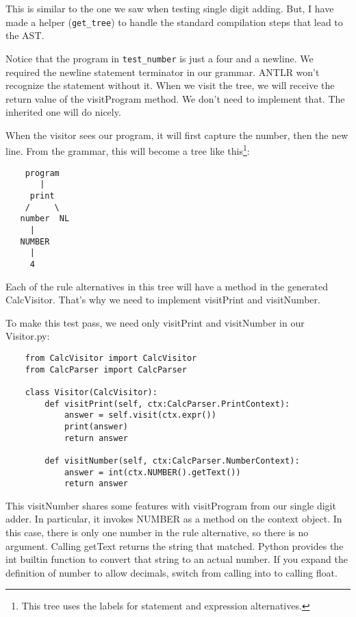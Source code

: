 This is similar to the one we saw when testing single digit adding.
But, I have made a helper (\verb+get_tree+) to handle the standard compilation
steps that lead to the AST.

Notice that the program in \verb+test_number+ is just a four and a newline.
We required the newline statement terminator in our grammar. ANTLR
won't recognize the statement without it. When we visit the tree,
we will receive the return value of the visitProgram method. We don't need
to implement that. The inherited one will do nicely.

When the visitor sees our program, it will first capture the number,
then the new line. From the grammar, this will become a tree like
this\footnote{This tree uses the labels for statement and
expression alternatives.}:

{\footnotesize
\begin{verbatim}
    program
       |
     print    
    /     \
   number  NL
     |
   NUMBER
     |
     4
\end{verbatim}
}

Each of the rule alternatives in this tree will have a method in
the generated CalcVisitor. That's why we need to implement visitPrint
and visitNumber.

To make this test pass, we need only visitPrint and visitNumber in
our Visitor.py:

{\footnotesize
\begin{verbatim}
    from CalcVisitor import CalcVisitor
    from CalcParser import CalcParser

    class Visitor(CalcVisitor):
        def visitPrint(self, ctx:CalcParser.PrintContext):
            answer = self.visit(ctx.expr())
            print(answer)
            return answer

        def visitNumber(self, ctx:CalcParser.NumberContext):
            answer = int(ctx.NUMBER().getText())
            return answer
\end{verbatim}
}

This visitNumber shares some features with visitProgram from our single
digit adder. In particular, it invokes NUMBER as a method on the context
object. In this case, there is only one number in the rule alternative,
so there is no argument. Calling getText returns the string that matched.
Python provides the int builtin function to convert that string to an
actual number. If you expand the definition of number to allow
decimals, switch from calling into to calling float.

